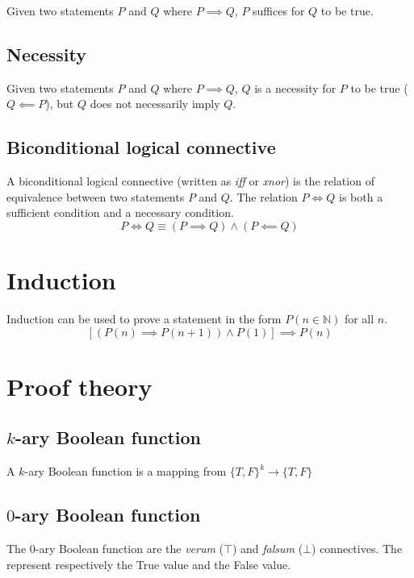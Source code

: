\documentclass{article}
\begin{document}
Given two statements \(P\) and \(Q\) where \(P \implies Q\),
\(P\) suffices for \(Q\) to be true.

\subsection{Necessity}

Given two statements \(P\) and \(Q\) where \(P \implies Q\),
\(Q\) is a necessity for \(P\) to be true (\(Q \impliedby P\)), but
\(Q\) does not necessarily imply \(Q\).

\subsection{Biconditional logical connective}

A biconditional logical connective (written as \textit{iff} or \textit{xnor})
is the relation of equivalence
between two statements \(P\) and \(Q\).
The relation \(P \iff Q\) is both a sufficient condition and
a necessary condition.
\[
    P \iff Q
    \equiv
    (P \implies Q) \land (P \impliedby Q)
\]

\pagebreak

\section{Induction}

Induction can be used to prove a statement in the form \(P(n \in \mathbb{N})\)
for all \(n\).
\[
    [(P(n) \implies P(n+1)) \land P(1)] \implies P(n)
\]

\pagebreak

\section{Proof theory}

\subsection{\(k\)-ary Boolean function}

A \(k\)-ary Boolean function is a mapping from \({\{T, F\}}^k \to \{T,F\}\)

\subsection{\(0\)-ary Boolean function}

The \(0\)-ary Boolean function are the \textit{verum} (\(\top\)) and \textit{falsum} (\(\bot\)) connectives.
The represent respectively the True value and the False value.
\end{document}
